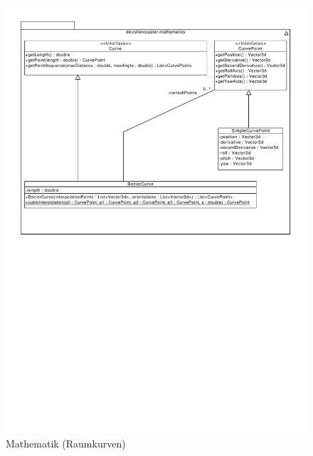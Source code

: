\begin{figure}
\includegraphics[width=\linewidth]{bilder/Mathematics}
\caption{Mathematik (Raumkurven)}
\end{figure}
